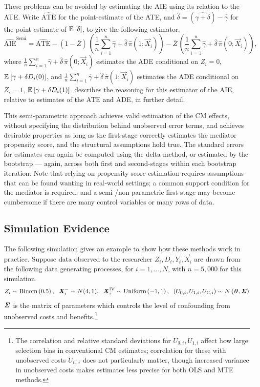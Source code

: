 These problems can be avoided by estimating the AIE using its relation to the ATE.
Write $\hat{\text{ATE}}$ for the point-estimate of the ATE, and 
$\hat\delta = (\hat{\gamma + \delta}) - \hat\gamma$ for the point estimate of $\mathbb{E}_{} \left[ \delta \right]$, to give the following estimator,
\[ \hat{\text{AIE}}^{\text{Semi}}
    = \hat{\text{ATE}}
    - (1 - \bar Z) \, \left( 
        \frac 1n \sum_{i = 1}^n \hat\gamma + \hat \delta \, \hat\pi(1; \vec X_i) \right)
    - \bar Z \, \left(
        \frac 1n \sum_{i = 1}^n \hat\gamma + \hat \delta \, \hat\pi(0; \vec X_i)  \right), \]
where $\frac 1n \sum_{i = 1}^n \hat\gamma + \hat \delta \, \hat\pi(0; \vec X_i)$ estimates the ADE conditional on $Z_i = 0$, $\mathbb{E}_{} \left[ \gamma + \delta D_i(0) \right]$, and $\frac 1n \sum_{i = 1}^n \hat\gamma + \hat \delta \, \hat\pi(1; \vec X_i)$ estimates the ADE conditional on $Z_i = 1$, $\mathbb{E}_{} \left[ \gamma + \delta D_i(1) \right]$.
 describes the reasoning for this estimator of the AIE, relative to estimates of the ATE and ADE, in further detail.

This semi-parametric approach achieves valid estimation of the CM effects, without specifying the distribution behind unobserved error terms, and achieves desirable properties as long as the first-stage correctly estimates the mediator propensity score, and the structural assumptions hold true.
The standard errors for estimates can again be computed using the delta method, or estimated by the bootstrap --- again, across both first and second-stages within each bootstrap iteration.
Note that relying on propensity score estimation requires assumptions that can be found wanting in real-world settings; a common support condition for the mediator is required, and a semi-/non-parametric first-stage may become cumbersome if there are many control variables or many rows of data.

\subsection{Simulation Evidence}
\label{sec:simulations}
The following simulation gives an example to show how these methods work in practice.
Suppose data observed to the researcher $Z_i, D_i, Y_i, \vec X_i$ are drawn from the following data generating processes, for $i = 1, \hdots, N$, with 
$n = 5,000$ for this simulation.
\[ Z_i \sim \text{Binom}\left(0.5 \right),
    \;\; \boldsymbol{\mathit{X}}_i^- \sim N(4, 1),
    \;\; \boldsymbol{\mathit{X}}_i^{\text{IV}} \sim \text{Uniform}\left( -1, 1 \right),
    \;\; \left( U_{0,i}, U_{1,i}, U_{C,i} \right) \sim
    N\left( \boldsymbol{\mathit{0}}, \boldsymbol{\mathit{\Sigma}} \right) \]
$\boldsymbol{\mathit{\Sigma}}$ is the matrix of parameters which controls the level of confounding from unobserved costs and benefits.\footnote{
    The correlation and relative standard deviations for $U_{0,i}, U_{1,i}$ affect how large selection bias in conventional CM estimates; correlation for these with unobserved costs $U_{C,i}$ does not particularly matter, though increased variance in unobserved costs makes estimates less precise for both OLS and MTE methods.
}

